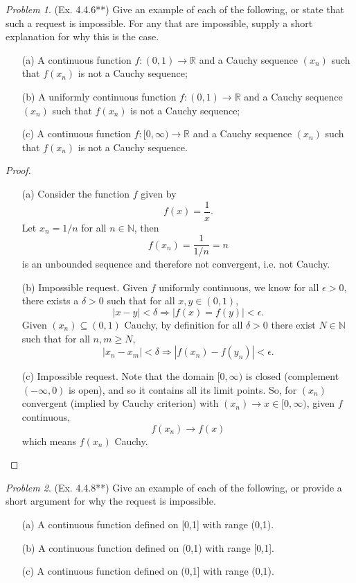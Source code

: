 \documentclass[11pt,twoside, reqno]{amsart}
\theoremstyle{remark}
\newtheorem{Prob}{Problem}
\def\R{\mathbb R}
\def\N{\mathbb N}
\renewcommand{\implies}{\Rightarrow}
\begin{document}
\begin{Prob}(Ex. 4.4.6**) Give an example of each of the following, or state that such a request is impossible. For any that are impossible, supply a short explanation for why this is the case.
\begin{enumerate}
    \item [(a)] A continuous function $f : (0,1) \to \R$ and a Cauchy sequence $(x_n)$ such that $f(x_n)$ is not a Cauchy sequence;
    \item [(b)] A uniformly continuous function $f : (0,1) \to \R$ and a Cauchy sequence $(x_n)$ such that $f(x_n)$ is not a Cauchy sequence;
    \item [(c)] A continuous function $f : [0,\infty) \to \R$ and a Cauchy sequence $(x_n)$ such that $f(x_n)$ is not a Cauchy sequence.
\end{enumerate}
\end{Prob}

\begin{proof}
\begin{enumerate}
    \item [(a)] Consider the function $f$ given by
    $$
        f(x) = \frac{1}{x}.
    $$
    Let $x_n = 1 / n$ for all $n \in \N$, then 
    $$
        f(x_n) = \frac{1}{1 / n} = n
    $$
    is an unbounded sequence and therefore not convergent, i.e. not Cauchy.
    \item [(b)] Impossible request. Given $f$ uniformly continuous, we know for all $\epsilon > 0$, there exists a $\delta > 0$ such that for all $x, y \in (0,1)$,
    $$
        |x - y| < \delta \implies |f(x) = f(y)| < \epsilon.
    $$
    Given $(x_n) \subseteq (0,1)$ Cauchy, by definition for all $\delta > 0$ there exist $N \in \N$ such that for all $n,m \geq N$,
    $$
        |x_n - x_m| < \delta \implies |f(x_n) - f(y_n)| < \epsilon.
    $$
    \item [(c)] Impossible request. Note that the domain $[0,\infty)$ is closed (complement $(-\infty,0)$ is open), and so it contains all its limit points. So, for $(x_n)$ convergent (implied by Cauchy criterion) with $(x_n) \to x \in [0, \infty)$, given $f$ continuous, 
    $$
        f(x_n) \to f(x)
    $$
    which means $f(x_n)$ Cauchy.
\end{enumerate}

\end{proof}

\begin{Prob}(Ex. 4.4.8**) Give an example of each of the following, or provide a short argument for why the request is impossible.
\begin{enumerate}
    \item [(a)] A continuous function defined on [0,1] with range (0,1).
    \item [(b)] A continuous function defined on (0,1) with range [0,1].
    \item [(c)] A continuous function defined on (0,1] with range (0,1).
\end{enumerate}
\end{Prob}
\end{document}
